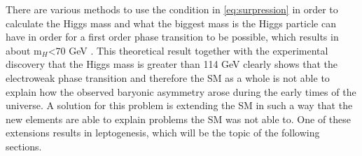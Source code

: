 There are various methods to use the condition in \eqref{eq:surpression} in order to calculate the Higgs mass and what the biggest mass is the Higgs particle can have in order for a first order phase transition to be possible, which results in about m$_H$<70 GeV \cite[pp. 3f.]{Fodor:1999at}. \newline\indent
This theoretical result together with the experimental discovery that the Higgs mass is greater than 114 GeV \cite[pp. 100ff.]{Abbaneo:2001ix} clearly shows that the electroweak phase transition and therefore the SM as a whole is not able to explain how the observed baryonic asymmetry arose during the early times of the universe. \newline\indent
A solution for this problem is extending the SM in such a way that the new elements are able to explain problems the SM was not able to. One of these extensions results in leptogenesis, which will be the topic of the following sections.